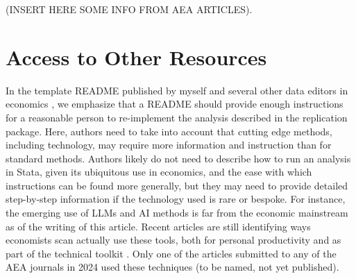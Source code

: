 \documentclass{article}
\begin{document}
(INSERT HERE SOME INFO FROM AEA ARTICLES). 






%


\section{Access to Other Resources}
\label{sec:other_resources}

In the template README published by myself and several other data editors in economics \parencite{templateREADMEv1.1}, we emphasize that a README should provide enough instructions for a reasonable person to re-implement the analysis described in the replication package. Here, authors need to take into account that cutting edge methods, including technology, may require more information and instruction than for standard methods. Authors likely do not need to describe how to run an analysis in Stata, given its ubiquitous use in economics, and the ease with which instructions can be found more generally, but they may need to provide detailed step-by-step information if the technology used is rare or bespoke. For instance, the emerging use of \acp{LLM} and \ac{AI} methods is far from the economic mainstream as of the writing of this article. Recent articles are still identifying ways economists scan actually use these tools, both for personal productivity \parencite{korinek_generative_2023} and as part of the technical toolkit \parencite{athey_machine_2019,dell_deep_2024}. Only one of the articles submitted to any of the AEA journals in 2024 used these techniques (to be named, not yet published).
\end{document}
